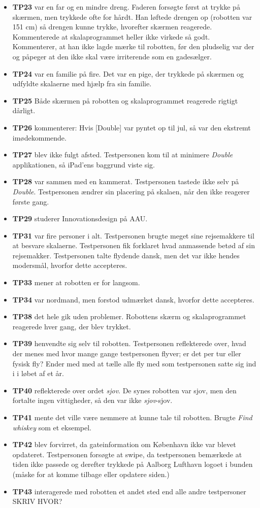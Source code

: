 \begin{itemize}
\item \textbf{TP23} var en far og en mindre dreng. Faderen forsøgte først at trykke på skærmen, men trykkede ofte for hårdt. Han løftede drengen op (robotten var 151 cm) så drengen kunne trykke, hvorefter skærmen reagerede. Kommenterede at skalaprogrammet heller ikke virkede så godt. Kommenterer, at han ikke lagde mærke til robotten, før den pludselig var der og påpeger at den ikke skal være irriterende som en gadesælger.
\item \textbf{TP24} var en familie på fire. Det var en pige, der trykkede på skærmen og udfyldte skalaerne med hjælp fra sin familie.
\item \textbf{TP25} Både skærmen på robotten og skalaprogrammet reagerede rigtigt dårligt.
\item \textbf{TP26} kommenterer: Hvis [Double] var pyntet op til jul, så var den ekstremt imødekommende.
\item \textbf{TP27} blev ikke fulgt afsted. Testpersonen kom til at minimere \textit{Double} applikationen, så iPad'ens baggrund viste sig.
\item \textbf{TP28} var sammen med en kammerat. Testpersonen tastede ikke selv på \textit{Double}. Testpersonen ændrer sin placering på skalaen, når den ikke reagerer første gang.
\item \textbf{TP29} studerer Innovationsdesign på AAU.
\item \textbf{TP31} var fire personer i alt. Testpersonen brugte meget sine rejsemakkere til at besvare skalaerne. Testpersonen fik forklaret hvad anmassende betød af sin rejsemakker. Testpersonen talte flydende dansk, men det var ikke hendes modersmål, hvorfor dette accepteres.
\item \textbf{TP33} mener at robotten er for langsom.
\item \textbf{TP34} var nordmand, men forstod udmærket dansk, hvorfor dette accepteres.
\item \textbf{TP38} det hele gik uden problemer. Robottens skærm og skalaprogrammet reagerede hver gang, der blev trykket.
\item \textbf{TP39} henvendte sig selv til robotten. Testpersonen reflekterede over, hvad der menes med hvor mange gange testpersonen flyver; er det per tur eller fysisk fly? Ender med med at tælle alle fly med som testpersonen satte sig ind i i løbet af et år.
\item \textbf{TP40} reflekterede over ordet \textit{sjov}. De synes robotten var sjov, men den fortalte ingen vittigheder, så den var ikke \textit{sjov}-sjov.
\item \textbf{TP41} mente det ville være nemmere at kunne tale til robotten. Brugte \textit{Find whiskey} som et eksempel.
\item \textbf{TP42} blev forvirret, da gateinformation om København ikke var blevet opdateret. Testpersonen forsøgte at swipe, da testpersonen bemærkede at tiden ikke passede og derefter trykkede på Aalborg Lufthavn logoet i bunden (måske for at komme tilbage eller opdatere siden.)
\item \textbf{TP43} interagerede med robotten et andet sted end alle andre testpersoner SKRIV HVOR?
\end{itemize}
